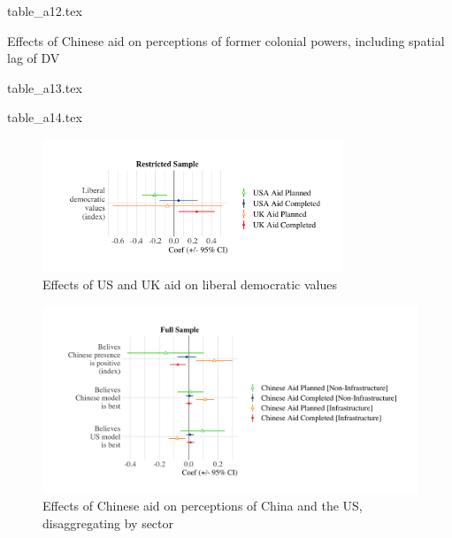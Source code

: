 \documentclass[9pt]{article}
\begin{document}
\noindent {}
{table_a12.tex} %

\newpage %

\setlength{\tabcolsep}{5pt}
\begin{table}[H]
\caption{Effects of Chinese aid on perceptions of former colonial powers, including spatial lag of DV}
\label{reg}
\centering
{table_a13.tex} %
\end{table}

\noindent {}
{table_a14.tex} %

\begin{figure}[H]
\centering
\includegraphics[width=0.8\textwidth]{figures/figure_a21.png} %
\caption{Effects of US and UK aid on liberal democratic values}
\end{figure}

\begin{figure}[H]
\centering
\includegraphics[width=1\textwidth]{figures/figure_a17.png} %
\caption{Effects of Chinese aid on perceptions of China and the US, disaggregating by sector}
\end{figure}
\end{document}

